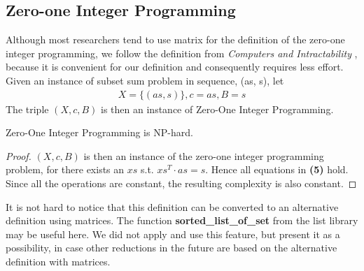 \subsection{Zero-one Integer Programming}
Although most researchers tend to use matrix for the 
definition of the zero-one integer programming, we follow the definition from \textit{Computers and Intractability} \cite{garey1979computers}, because 
it is convenient for our definition and consequently requires less effort. Given an instance of subset sum problem in sequence,
(as, s), let 
\begin{align*}
    X = \{(as, s)\}, c = as, B = s
\end{align*} 
The triple $(X, c, B)$ is then an instance of Zero-One Integer Programming.
\begin{theorem}
    Zero-One Integer Programming is NP-hard.
\end{theorem}
\begin{proof}
    $(X, c, B)$ is then an instance of the zero-one integer programming problem,
    for there exists an $xs$ s.t. $xs^T \cdot as = s$. Hence all equations in \textbf{(5)} hold.
    Since all the operations are constant, the resulting complexity is also constant.
\end{proof}
It is not hard to notice that this definition can be converted to an alternative definition using matrices. 
The function \textbf{sorted\_list\_of\_set} from the list library may be useful here. 
We did not apply and use this feature, but present it as a possibility, 
in case other reductions in the future are based on the alternative definition with matrices.
